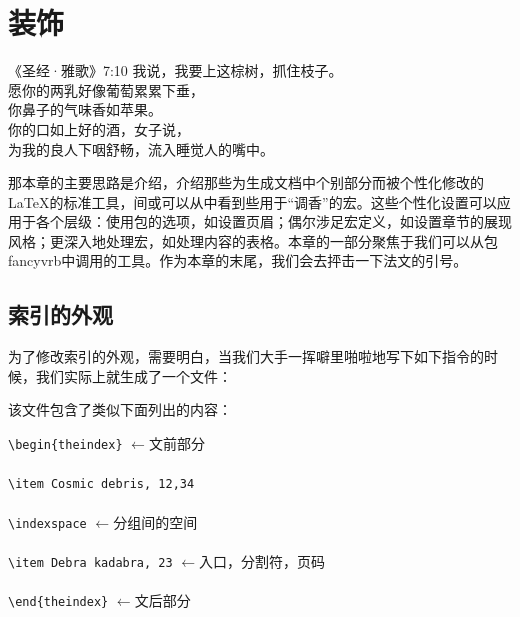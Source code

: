 \chapter{装饰}

\begin{epigraphe}{《圣经·雅歌》7:10}
    我说，我要上这棕树，抓住枝子。\\愿你的两乳好像葡萄累累下垂，\\你鼻子的气味香如苹果。\\你的口如上好的酒，女子说，\\为我的良人下咽舒畅，流入睡觉人的嘴中。
\end{epigraphe}

那本章的主要思路是介绍，介绍那些为生成文档中个别部分而被个性化修改的\LaTeX 的标准工具，间或可以从中看到些用于“调香”的宏。这些个性化设置可以应用于各个层级：使用包的选项，如设置页眉；偶尔涉足宏定义，如设置章节的展现风格；更深入地处理宏，如处理内容的表格。本章的一部分聚焦于我们可以从包\textsf{fancyvrb}中调用的工具。作为本章的末尾，我们会去抨击一下法文的引号。

\section{索引的外观} %

为了修改索引的外观，需要明白，当我们大手一挥噼里啪啦地写下如下指令的时候，我们实际上就生成了一个文件：


该文件包含了类似下面列出的内容：

\begin{dmd}
\verb|\begin{theindex}| \quad$\leftarrow$\textsf{文前部分}\\
~\\
\verb|\item Cosmic debris, 12,34|\\
~\\
\verb|\indexspace| \quad$\leftarrow$\textsf{分组间的空间}\\
~\\
\verb|\item Debra kadabra, 23| \quad$\leftarrow$\textsf{入口，分割符，页码}\\
~\\
\verb|\end{theindex}| \quad$\leftarrow$\textsf{文后部分}
\end{dmd}

